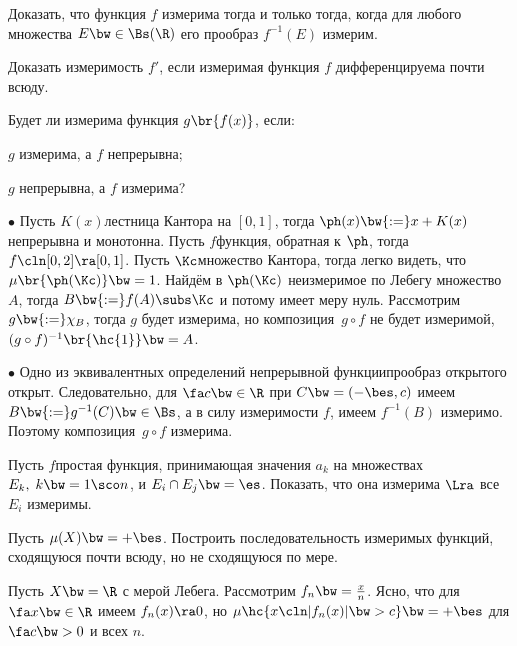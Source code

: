 \documentclass[a4paper]{article}
\begin{document}
\begin{problem}
  Доказать, что функция $f$ измерима тогда и только тогда, когда для любого
  множества $E \bw\in \Bs(\R)$ его прообраз $f^{-1}(E)$ измерим.
\end{problem}

\begin{problem}
  Доказать измеримость $f'$, если измеримая функция $f$ дифференцируема почти всюду.
\end{problem}

\begin{problem}
  Будет ли измерима функция $g\br{f(x)}$, если:
  \begin{items}{-3}
    \item $g$ измерима, а $f$ непрерывна;
    \item $g$ непрерывна, а $f$ измерима?
  \end{items}
\end{problem}
\begin{solution}

  $\bullet$ Пусть $K(x)$\т лестница Кантора на $[0,1]$, тогда $\ph(x) \bw{:=} x + K(x)$
  непрерывна и монотонна. Пусть $f$\т функция, обратная к $\ph$, тогда $f\cln [0,2] \ra [0,1]$.
  Пусть $\Kc$\т множество Кантора, тогда легко видеть, что $\mu\br{\ph(\Kc)} \bw= 1$. Найдём
  в $\ph(\Kc)$ неизмеримое по Лебегу множество~$A$, тогда $B \bw{:=} f(A) \subs \Kc$ и потому
  имеет меру нуль. Рассмотрим $g \bw{:=} \chi_B$, тогда $g$ будет измерима, но композиция~$g\circ f$
  не будет измеримой,  $(g\circ f)^{-1}\br{\hc{1}} \bw= A$.

  $\bullet$ Одно из эквивалентных определений непрерывной функции\т прообраз открытого открыт.
  Следовательно, для $\fa c \bw\in \R$ при $C \bw= (-\bes, c)$ имеем
  $B \bw{:=} g^{-1}(C) \bw\in \Bs$, а в силу измеримости $f$, имеем $f^{-1}(B)$ измеримо.
  Поэтому композиция~$g\circ f$ измерима.
\end{solution}

\begin{problem}
  Пусть $f$\т простая функция, принимающая значения $a_k$ на множествах $E_k, \; k\bw=1\sco n$, и
  $E_i \cap E_j \bw= \es$. Показать, что она измерима $\Lra$ все $E_i$ измеримы.
\end{problem}

\begin{problem}
  Пусть $\mu(X) \bw= +\bes$. Построить последовательность измеримых функций, сходящуюся почти всюду,
  но не сходящуюся по мере.
\end{problem}
\begin{solution}
  Пусть $X \bw= \R$ с мерой Лебега. Рассмотрим $f_n \bw= \frac xn$. Ясно, что для $\fa x \bw\in \R$
  имеем $f_n(x) \ra 0$, но $\mu\hc{x\cln |f_n(x)| \bw> c} \bw= +\bes$ для $\fa c \bw> 0$ и всех $n$.
\end{solution}
\end{document}

